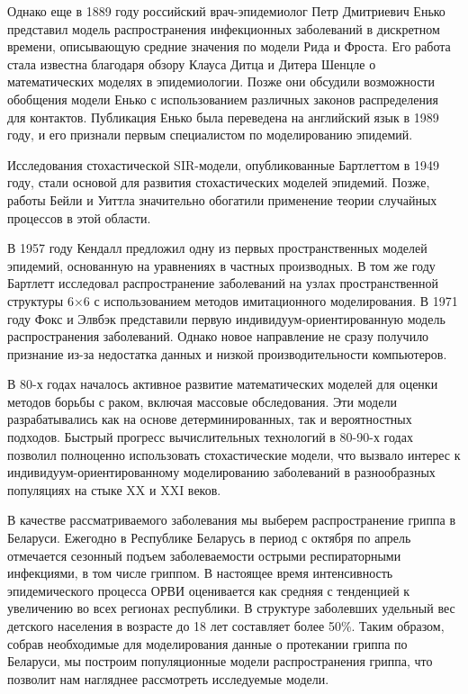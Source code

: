\documentclass[a4paper, 14pt]{extreport}
\begin{document}
	Однако еще в 1889 году российский врач-эпидемиолог Петр Дмитриевич Енько представил модель распространения инфекционных заболеваний в дискретном времени, описывающую средние значения по модели Рида и Фроста. Его работа стала известна благодаря обзору Клауса Дитца и Дитера Шенцле о математических моделях в эпидемиологии. Позже они обсудили возможности обобщения модели Енько с использованием различных законов распределения для контактов. Публикация Енько была переведена на английский язык в 1989 году, и его признали первым специалистом по моделированию эпидемий.
	
	Исследования стохастической SIR-модели, опубликованные Бартлеттом в 1949 году, стали основой для развития стохастических моделей эпидемий. Позже, работы Бейли и Уиттла значительно обогатили применение теории случайных процессов в этой области.
	
	В 1957 году Кендалл предложил одну из первых пространственных моделей эпидемий, основанную на уравнениях в частных производных. В том же году Бартлетт исследовал распространение заболеваний на узлах пространственной структуры 6×6 с использованием методов имитационного моделирования. В 1971 году Фокс и Элвбэк представили первую индивидуум-ориентированную модель распространения заболеваний. Однако новое направление не сразу получило признание из-за недостатка данных и низкой производительности компьютеров.
	
	В 80-х годах началось активное развитие математических моделей для оценки методов борьбы с раком, включая массовые обследования. Эти модели разрабатывались как на основе детерминированных, так и вероятностных подходов. Быстрый прогресс вычислительных технологий в 80-90-х годах позволил полноценно использовать стохастические модели, что вызвало интерес к индивидуум-ориентированному моделированию заболеваний в разнообразных популяциях на стыке XX и XXI веков.
	
	В качестве рассматриваемого заболевания мы выберем распространение гриппа в Беларуси. Ежегодно в Республике Беларусь в период с октября по апрель отмечается сезонный подъем заболеваемости острыми респираторными инфекциями, в том числе гриппом. В настоящее время интенсивность эпидемического процесса ОРВИ оценивается как средняя с тенденцией к увеличению во всех регионах республики. В структуре заболевших удельный вес детского населения в возрасте до 18 лет составляет более 50\%. Таким образом, собрав необходимые для моделирования данные о протекании гриппа по Беларуси, мы построим популяционные модели распространения гриппа, что позволит нам нагляднее рассмотреть исследуемые модели.
	
\end{document}
